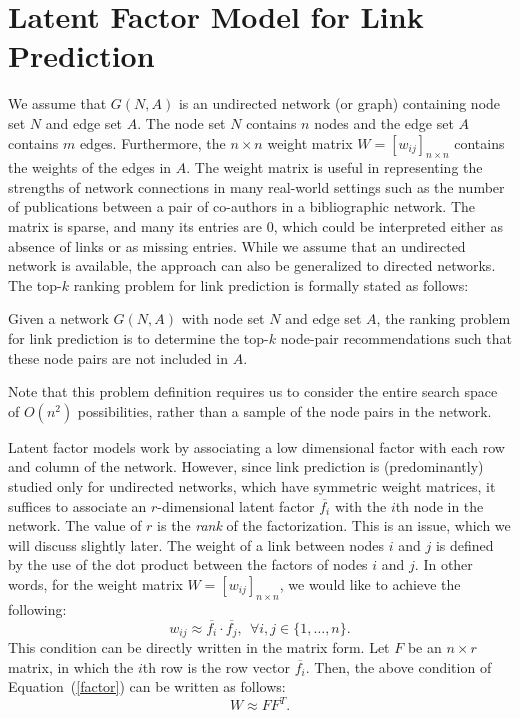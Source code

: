\section{Latent Factor Model for Link Prediction}
\label{sec-NMF}


We assume that $G(N, A)$ is an undirected network (or graph) containing node set $N$ and
edge set $A$. The node set $N$ contains $n$ nodes and the edge set
$A$ contains $m$ edges. Furthermore, the $n \times n$ weight matrix
$W= [w_{ij}]_{n\times n}$ contains the weights of the edges in $A$.
The weight matrix is useful in representing the strengths of network
connections in  many real-world settings such as the number of
publications between a pair of co-authors in a bibliographic
network.  The matrix is sparse, and many its entries are 0, which could be
interpreted either as absence of links or as missing entries. While
we assume that an undirected network is available, the approach can
also be generalized to directed networks.
%
 The top-$k$ ranking problem for link prediction is formally stated as follows:

\begin{definition}
Given a network $G(N, A)$ with node set $N$ and edge set $A$, the ranking problem for link
prediction is to determine the top-$k$ node-pair recommendations such that these node pairs are not included in $A$.
\end{definition}
Note that this problem definition requires us to consider the entire
search space of $O(n^2)$ possibilities, rather than a sample of the
node pairs in the network.

Latent factor models work by associating a low dimensional factor
with each row and column of the network. However, since link
prediction is (predominantly) studied only for undirected networks,
which have symmetric weight matrices, it suffices to associate an
$r$-dimensional latent factor $\overline{f_i}$ with the $i$th node
in the network. The value of $r$ is the {\em rank} of the
factorization. This is an issue, which we will discuss slightly
later.  The weight of a link between nodes $i$ and $j$ is defined by
the use of the dot product between the factors of nodes $i$ and $j$.
In other words, for the weight matrix $W= [w_{ij}]_{n\times n}$, we
would like to achieve the following:
\begin{equation}
w_{ij} \approx \overline{f_i} \cdot \overline{f_j}, \ \ \forall i, j
\in \{ 1, \ldots, n \} \label{factor}.
\end{equation}
This condition can be directly written in the matrix form. Let $F$ be an
$n \times r$ matrix, in which the $i$th row is the row vector
$\overline{f_i}$. Then, the above condition of
Equation~(\ref{factor}) can be written as follows:
\begin{equation}
W \approx F F^T.
\end{equation}


